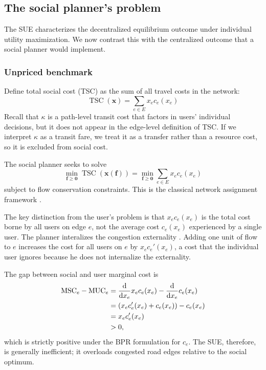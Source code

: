 \documentclass[12pt]{article}
\renewcommand{\vec}[1]{\mathbf{#1}}
\DeclareMathOperator{\TSC}{TSC}
\begin{document}
\subsection{The social planner's problem}

The SUE characterizes the decentralized equilibrium outcome under individual utility maximization.
We now contrast this with the centralized outcome that a social planner would implement.

\subsubsection{Unpriced benchmark}

Define total social cost (TSC) as the sum of all travel costs in the network:
\[
    \TSC(\vec{x}) = \sum_{e \in E} x_e c_e(x_e)
\]
Recall that $\kappa$ is a path-level transit cost that factors in users' individual decisions, but it does not appear in the edge-level definition of TSC.
If we interpret $\kappa$ as a transit fare, we treat it as a transfer rather than a resource cost, so it is excluded from social cost.

The social planner seeks to solve
\[
    \min_{\vec{f} \geq \vec{0}}{\TSC(\vec{x}(\vec{f}))} = \min_{\vec{f} \geq \vec{0}}{\sum_{e \in E} x_e c_e(x_e)}
\]
subject to flow conservation constraints.
This is the classical network assignment framework \citep{dafermos1969assignment}.

The key distinction from the user's problem is that $x_e c_e(x_e)$ is the total cost borne by all users on edge $e$, not the average cost $c_e(x_e)$ experienced by a single user.
The planner interalizes the congestion externality \citep{knight1924socialcost}.
Adding one unit of flow to $e$ increases the cost for all users on $e$ by $x_e c_e'(x_e)$, a cost that the individual user ignores because he does not internalize the externality.

The gap between social and user marginal cost is
\begin{align*}
    \mathrm{MSC}_e - \mathrm{MUC}_e &= \diff{}{x_e} x_e c_e(x_e) - \diff{}{x_e} c_e(x_e) \\
    &= \left(x_e c_e'(x_e) + c_e(x_e)\right) - c_e(x_e) \\
    &= x_e c_e'(x_e) \\
    &> 0,
\end{align*}
which is strictly positive under the BPR formulation for $c_e$.
The SUE, therefore, is generally inefficient; it overloads congested road edges relative to the social optimum.
\end{document}
